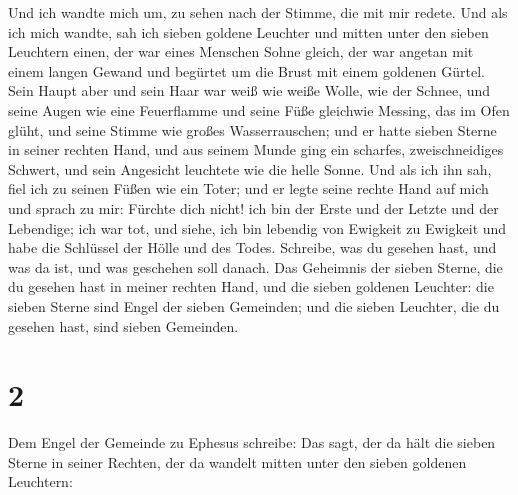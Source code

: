  Und ich wandte mich um, zu sehen nach der Stimme, die
mit mir redete. Und als ich mich wandte, sah ich sieben goldene Leuchter
 und mitten unter den sieben Leuchtern einen, der war
eines Menschen Sohne gleich, der war angetan mit einem langen Gewand und
begürtet um die Brust mit einem goldenen Gürtel.  Sein
Haupt aber und sein Haar war weiß wie weiße Wolle, wie der Schnee, und
seine Augen wie eine Feuerflamme  und seine Füße
gleichwie Messing, das im Ofen glüht, und seine Stimme wie großes
Wasserrauschen;  und er hatte sieben Sterne in seiner
rechten Hand, und aus seinem Munde ging ein scharfes, zweischneidiges
Schwert, und sein Angesicht leuchtete wie die helle Sonne.
 Und als ich ihn sah, fiel ich zu seinen Füßen wie ein
Toter; und er legte seine rechte Hand auf mich und sprach zu mir:
Fürchte dich nicht! ich bin der Erste und der Letzte  und
der Lebendige; ich war tot, und siehe, ich bin lebendig von Ewigkeit zu
Ewigkeit und habe die Schlüssel der Hölle und des Todes. 
Schreibe, was du gesehen hast, und was da ist, und was geschehen soll
danach.  Das Geheimnis der sieben Sterne, die du gesehen
hast in meiner rechten Hand, und die sieben goldenen Leuchter: die
sieben Sterne sind Engel der sieben Gemeinden; und die sieben Leuchter,
die du gesehen hast, sind sieben Gemeinden.

\hypertarget{section-1}{%
\section{2}\label{section-1}}

 Dem Engel der Gemeinde zu Ephesus schreibe: Das sagt, der
da hält die sieben Sterne in seiner Rechten, der da wandelt mitten unter
den sieben goldenen Leuchtern:

